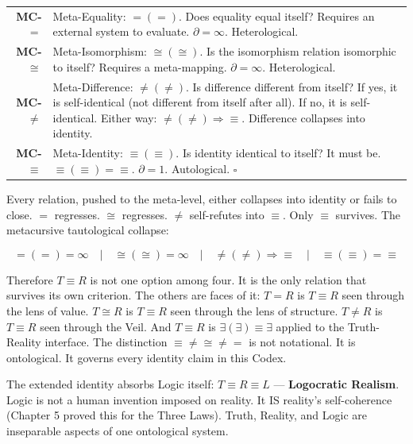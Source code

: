 \documentclass[10pt, openany, oneside]{book}
\renewcommand{\footnotesize}{\fontsize{8.5}{11}\selectfont}
\begin{document}
{\footnotesize
\noindent\begin{tabular}{r p{}}
\textbf{MC-$=$} & Meta-Equality: $=(=)$. Does equality equal itself? Requires an external system to evaluate. $\partial = \infty$. Heterological. \\[0.3em]
\textbf{MC-$\cong$} & Meta-Isomorphism: $\cong(\cong)$. Is the isomorphism relation isomorphic to itself? Requires a meta-mapping. $\partial = \infty$. Heterological. \\[0.3em]
\textbf{MC-$\neq$} & Meta-Difference: $\neq(\neq)$. Is difference different from itself? If yes, it is self-identical (not different from itself after all). If no, it is self-identical. Either way: $\neq(\neq) \Rightarrow \equiv$. Difference collapses into identity. \\[0.3em]
\textbf{MC-$\equiv$} & Meta-Identity: $\equiv(\equiv)$. Is identity identical to itself? It must be. $\equiv(\equiv) = \equiv$. $\partial = 1$. Autological. $\square$ \\[0.3em]
\end{tabular}
}

\vspace{0.8em}

\noindent Every relation, pushed to the meta-level, either collapses into identity or fails to close. $=$ regresses. $\cong$ regresses. $\neq$ self-refutes into $\equiv$. Only $\equiv$ survives. The metacursive tautological collapse:

$$\boxed{=(=) = \infty \quad | \quad \cong(\cong) = \infty \quad | \quad \neq(\neq) \Rightarrow \equiv \quad | \quad \equiv(\equiv) = \equiv}$$

Therefore $T \equiv R$ is not one option among four. It is the only relation that survives its own criterion. The others are faces of it: $T = R$ is $T \equiv R$ seen through the lens of value. $T \cong R$ is $T \equiv R$ seen through the lens of structure. $T \neq R$ is $T \equiv R$ seen through the Veil. And $T \equiv R$ is $\exists(\exists) \equiv \exists$ applied to the Truth-Reality interface. The distinction $\equiv \neq \cong \neq =$ is not notational. It is ontological. It governs every identity claim in this Codex.

The extended identity absorbs Logic itself: $T \equiv R \equiv L$ --- \textbf{Logocratic Realism}. Logic is not a human invention imposed on reality. It IS reality's self-coherence (Chapter 5 proved this for the Three Laws). Truth, Reality, and Logic are inseparable aspects of one ontological system.
\end{document}
